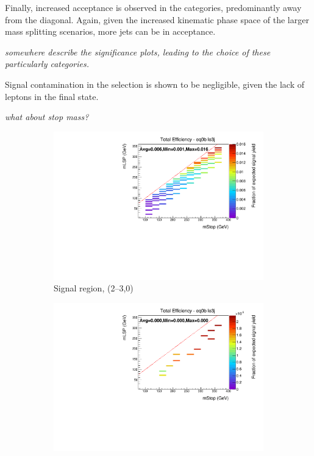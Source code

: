 Finally, increased acceptance is observed in the \njhigh categories, 
predominantly away from the diagonal. Again, given the increased kinematic phase
space of the larger mass splitting scenarios, more jets can be in 
acceptance.

\emph{somewhere describe the significance plots, leading to the choice of these 
particularly categories.}

Signal contamination in the \mj selection is shown to be negligible, given the 
lack of leptons in the final state.

\emph{what about stop mass?}

\begin{figure}[ht!]
  \centering
  \begin{subfigure}[b]{0.47\textwidth}
    \includegraphics[width=\textwidth, trim=0 0 0 24, clip=true]{Figs/sms/t2cc/v24/T2cc_v24_had_eff_maps_eq0b_le3j_SITV.pdf}
    \caption{Signal region, (2--3,0)}
    \label{fig:t2cc_sig_eff_le3j_0b}
  \end{subfigure}
  \begin{subfigure}[b]{0.47\textwidth}
    \includegraphics[width=\textwidth, trim=0 0 0 24, clip=true]{Figs/sms/t2cc/v24/T2cc_v24_muon_eff_maps_eq0b_le3j_SITV.pdf}

\end{subfigure}
\end{figure}
